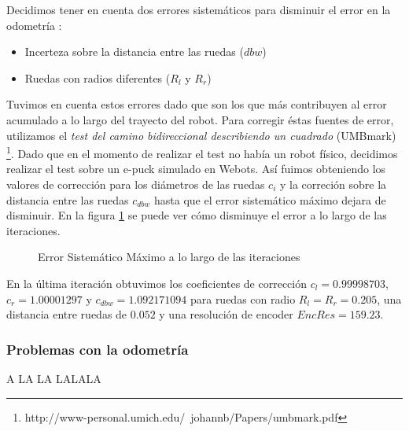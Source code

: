Decidimos tener en cuenta dos errores sistem\'aticos para disminuir el error
en la odometr\'ia :
\begin{itemize}
\item{Incerteza sobre la distancia entre las ruedas ($dbw$)}
\item{Ruedas con radios diferentes ($R_l$ y $R_r$)}
\end{itemize}
Tuvimos en cuenta estos errores dado que son los que m\'as contribuyen al error
acumulado a lo largo del trayecto del robot.
Para corregir \'estas fuentes de error, utilizamos el \emph{test del camino
bidireccional describiendo un cuadrado} (UMBmark)
\footnote{http://www-personal.umich.edu/~johannb/Papers/umbmark.pdf}. Dado que
en el momento de realizar el test no hab\'ia un robot f\'isico, decidimos
realizar el test sobre un e-puck simulado en Webots. As\'i fuimos obteniendo
los valores de correcci\'on para los di\'ametros de las ruedas $c_i$ y la
correci\'on sobre la distancia entre las ruedas $c_{dbw}$ hasta que el error
sistem\'atico m\'aximo dejara de disminuir. En la figura \ref{fig:errsist}
se puede ver c\'omo disminuye el error a lo largo de las iteraciones.

\begin{figure}[htp]
\begin{center}
\caption{Error Sistem\'atico M\'aximo a lo largo de las iteraciones}
\label{fig:errsist}
\end{center}
\end{figure}

En la \'ultima iteraci\'on obtuvimos los coeficientes de correcci\'on
$c_l = 0.99998703$, $c_r = 1.00001297$ y $c_{dbw} = 1.092171094$ para ruedas
con radio $R_l = R_r = 0.205$, una distancia entre ruedas de $0.052$ y una
resoluci\'on de encoder $EncRes = 159.23$.

\subsubsection{Problemas con la odometr\'ia}
\label{odometry:problems}
A LA LA LALALA

\newpage
